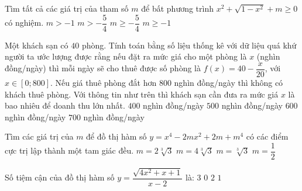 \begin{ex}%
Tìm tất cả các giá trị của tham số $m$ để bất phương trình $x^2+\sqrt{1-x^2}+m\ge 0$ có nghiệm.
\choice
{$m>-1$}
{$m>-\dfrac{5}{4}$}
{\True $m\ge -\dfrac{5}{4}$}
{$m\ge -1$}
\end{ex}
\begin{ex}%
Một khách sạn có $40$ phòng. Tính toán bằng số liệu thống kê với dữ liệu quá khứ người ta ước lượng được rằng nếu đặt ra mức giá cho một phòng là $x$ (nghìn đồng/ngày) thì mỗi ngày sẽ cho thuê được số phòng là $f(x)=40-\dfrac{x}{20}$, với $x\in [0;800]$. Nếu giá thuê phòng đắt hơn $800$ nghìn đồng/ngày thì không có khách thuê phòng. Với thông tin như trên thì khách sạn cần đưa ra mức giá $x$ là bao nhiêu để doanh thu lớn nhất.
\choice
{\True $400$ nghìn đồng/ngày}
{$500$ nghìn đồng/ngày}
{$600$ nghìn đồng/ngày}
{$700$ nghìn đồng/ngày}
\end{ex}
\begin{ex}%
Tìm các giá trị của $m$ để đồ thị hàm số $y=x^4-2mx^2+2m+m^4$ có các điểm cực trị lập thành một tam giác đều.
\choice
{$m=2\sqrt[3]{3}$}
{$m=4\sqrt[3]{3}$}
{\True $m=\sqrt[3]{3}$}
{$m=\dfrac{1}{2}$}
\end{ex}
\begin{ex}%
Số tiệm cận của đồ thị hàm số $y=\dfrac{\sqrt{4x^2+x+1}}{x-2}$ là:
\choice
{\True $3$}
{$0$}
{$2$}
{$1$}
\end{ex}

